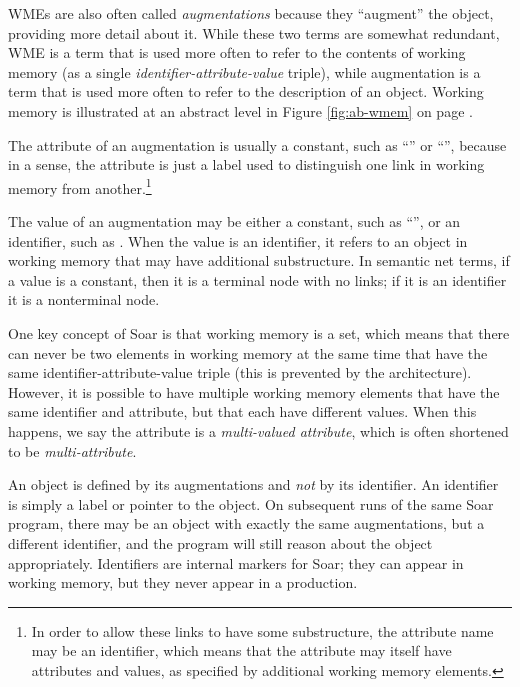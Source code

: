 WMEs are also often called \textit{augmentations} because they
``augment'' the object, providing more detail about it. While these two
terms are somewhat redundant, WME is a term that is used more often to
refer to the contents of working memory (as a single \textit{identifier-attribute-value} triple), 
while augmentation is a term that is used more often to refer to the description of an object.
Working memory is illustrated at an abstract level in Figure
\ref{fig:ab-wmem} on page \pageref{fig:ab-wmem}. 

The attribute of an augmentation is usually a constant, such as ``'' or
``'', because in a sense, the attribute is just a label used to
distinguish one link in working memory from another.\footnote{In order to
allow these links to have some substructure, the attribute name may be an
identifier, which means that the attribute may itself have attributes and
values, as specified by additional working memory elements.}

The value of an augmentation may be either a constant, such as ``'', or
an identifier, such as . When the value is an identifier, it refers
to an object in working memory that may have additional substructure. In
semantic net terms, if a value is a constant, then it is a terminal node with
no links; if it is an identifier it is a nonterminal node.

One key concept of Soar is that working memory is a set, which means that there can never be two elements in
working memory at the same time that have the same identifier-attribute-value
triple (this is prevented by the architecture). However, it is possible to have
multiple working memory elements that have the same identifier and attribute,
but that each have different values.  When this happens, we say the attribute
is a \emph{multi-valued attribute}, which is often shortened to be
\emph{multi-attribute}.

An object is defined by its augmentations and
\emph{not} by its identifier. An identifier is simply a label or pointer to the object. On subsequent runs of the same Soar program,
there may be an object with exactly the same augmentations, but a different
identifier, and the program will still reason about the object
appropriately. Identifiers are internal markers for Soar; they can appear
in working memory, but they never appear in a production.

